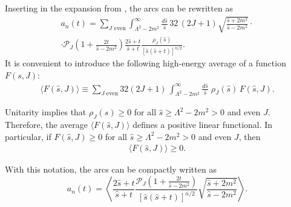 Inserting in the expansion from , the arcs can be rewritten as 
\begin{equation}
    \begin{split}
    a_n(t) = \sum_{J \text{ even}} \int_{\Lambda^2-2m^2}^{\infty} \frac{d\hat{s}}{\hat{s}} \, 32 \, (2 J + 1) \sqrt{\frac{\hat{s} + 2m^2}{\hat{s} - 2m^2}} \cdot \\
    \cdot \mathcal{P}_J \left( 1 + \frac{2t}{\hat{s}-2m^2} \right) \frac{2\hat{s}+t}{\hat{s}+t}\frac{\rho_J(\hat{s})}{[\hat{s}(\hat{s}+t)]^{n/2}}.
    \end{split}
    \end{equation}
It is convenient to introduce the following high-energy average of a function $F(s,J)$:
\begin{eqnarray}
    \langle F(\hat{s},J) \rangle
    \equiv
    \sum_{J \text{ even}} 32   (2J+1)\, \int_{\Lambda^2-2m^2}^{\infty} \frac{d\hat{s}}{\hat{s}} \; 
    \rho_J(\hat{s})\, F(\hat{s},J).
\end{eqnarray}

Unitarity implies that $\rho_J(s)\geq 0$ for all $\hat{s}\geq\Lambda^2-2m^2>0$ and even $J$. Therefore, the average
$\langle F(\hat{s},J)\rangle$ defines a positive linear functional. In particular, if
$F(\hat{s},J)\geq 0$ for all $\hat{s}\geq\Lambda^2-2m^2>0$ and even $J$, then
\begin{eqnarray}
    \langle F(\hat{s},J) \rangle \geq 0 .
\end{eqnarray}

With this notation, the arcs  can be compactly written as
\begin{equation}
    a_n(t)
    =
    \left\langle
    \frac{2\hat{s}+t}{\hat{s}+t}
    \frac{
        \mathcal{P}_J\left(1+\frac{2t}{\hat{s}-2m^2}\right)
    }{
        [\hat{s}(\hat{s}+t)]^{n/2}
    }
    \sqrt{\frac{\hat{s} + 2m^2}{\hat{s} - 2m^2}}
    \right\rangle.
\end{equation}

